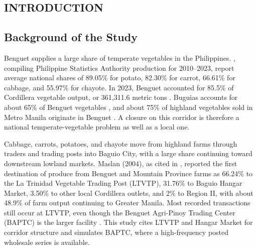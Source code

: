 \documentclass{icsthesis}
\begin{document}
	\begin{mainmatter}
		\section{INTRODUCTION}

			\subsection{Background of the Study}

			Benguet supplies a large share of temperate vegetables in the Philippines. \citet{Aquino2025}, compiling Philippine Statistics Authority production for 2010--2023, report average national shares of 89.05\% for potato, 82.30\% for carrot, 66.61\% for cabbage, and 55.97\% for chayote. In 2023, Benguet accounted for 85.5\% of Cordillera vegetable output, or 361,311.6 metric tons \citep{PSARSSOCAR_nd}. Buguias accounts for about 65\% of Benguet vegetables \citep{Agoot2018}, and about 75\% of highland vegetables sold in Metro Manila originate in Benguet \citep{PNA2018}. A closure on this corridor is therefore a national temperate-vegetable problem as well as a local one.

			Cabbage, carrots, potatoes, and chayote move from highland farms through traders and trading posts into Baguio City, with a large share continuing toward downstream lowland markets. Maslan (2004), as cited in \citet{Fangasan2009}, reported the first destination of produce from Benguet and Mountain Province farms as 66.24\% to the La Trinidad Vegetable Trading Post (LTVTP), 31.76\% to Baguio Hangar Market, 3.50\% to other local Cordillera outlets, and 2\% to Region II, with about 48.9\% of farm output continuing to Greater Manila. Most recorded transactions still occur at LTVTP, even though the Benguet Agri-Pinoy Trading Center (BAPTC) is the larger facility \citep{deGuzmanBambicoBaconguis2023}. This study cites LTVTP and Hangar Market for corridor structure and simulates BAPTC, where a high-frequency posted wholesale series is available.


\end{mainmatter}
\end{document}
